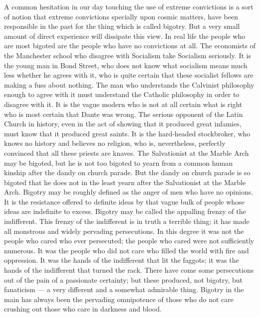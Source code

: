 A common hesitation in our day touching the use of extreme convictions is a sort of notion that extreme convictions specially upon cosmic matters, have been responsible in the past for the thing which is called bigotry. But a very small amount of direct experience will dissipate this view. In real life the people who are most bigoted are the people who have no convictions at all. The economists of the Manchester school who disagree with Socialism take Socialism seriously. It is the young man in Bond Street, who does not know what socialism means much less whether he agrees with it, who is quite certain that these socialist fellows are making a fuss about nothing. The man who understands the Calvinist philosophy enough to agree with it must understand the Catholic philosophy in order to disagree with it. It is the vague modern who is not at all certain what is right who is most certain that Dante was wrong. The serious opponent of the Latin Church in history, even in the act of showing that it produced great infamies, must know that it produced great saints. It is the hard-headed stockbroker, who knows no history and believes no religion, who is, nevertheless, perfectly convinced that all these priests are knaves. The Salvationist at the Marble Arch may be bigoted, but he is not too bigoted to yearn from a common human kinship after the dandy on church parade. But the dandy on church parade is so bigoted that he does not in the least yearn after the Salvationist at the Marble Arch. Bigotry may be roughly defined as the anger of men who have no opinions. It is the resistance offered to definite ideas by that vague bulk of people whose ideas are indefinite to excess. Bigotry may be called the appalling frenzy of the indifferent. This frenzy of the indifferent is in truth a terrible thing; it has made all monstrous and widely pervading persecutions. In this degree it was not the people who cared who ever persecuted; the people who cared were not sufficiently numerous. It was the people who did not care who filled the world with fire and oppression. It was the hands of the indifferent that lit the faggots; it was the hands of the indifferent that turned the rack. There have come some persecutions out of the pain of a passionate certainty; but these produced, not bigotry, but fanaticism — a very different and a somewhat admirable thing. Bigotry in the main has always been the pervading omnipotence of those who do not care crushing out those who care in darkness and blood.

